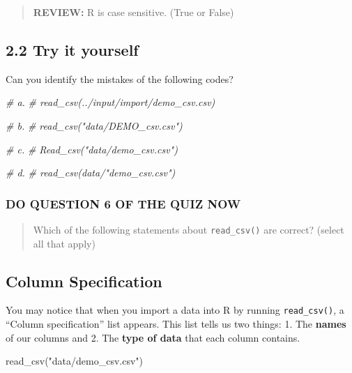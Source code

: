 \documentclass[
]{book}
\newenvironment{Shaded}{\begin{snugshade}}{\end{snugshade}}
\newcommand{\CommentTok}[1]{\textcolor[rgb]{0.56,0.35,0.01}{\textit{#1}}}
\newcommand{\FunctionTok}[1]{\textcolor[rgb]{0.00,0.00,0.00}{#1}}
\newcommand{\NormalTok}[1]{#1}
\newcommand{\StringTok}[1]{\textcolor[rgb]{0.31,0.60,0.02}{#1}}
\begin{document}
\begin{quote}
\textbf{REVIEW:} R is case sensitive. (True or False)
\end{quote}

\hypertarget{try-it-yourself-10}{%
\subsection{2.2 Try it yourself}\label{try-it-yourself-10}}

Can you identify the mistakes of the following codes?

\begin{Shaded}
\begin{Highlighting}[]
\CommentTok{\# a. }
\CommentTok{\# read\_csv(../input/import/demo\_csv.csv)}

\CommentTok{\# b.}
\CommentTok{\# read\_csv("data/DEMO\_csv.csv")}

\CommentTok{\# c.}
\CommentTok{\# Read\_csv("data/demo\_csv.csv")}

\CommentTok{\# d. }
\CommentTok{\# read\_csv(data/"demo\_csv.csv")}
\end{Highlighting}
\end{Shaded}

\hypertarget{do-question-6-of-the-quiz-now}{%
\subsubsection{DO QUESTION 6 OF THE QUIZ NOW}\label{do-question-6-of-the-quiz-now}}

\begin{quote}
Which of the following statements about \texttt{read\_csv()} are correct? (select all that apply)
\end{quote}

\hypertarget{column-specification}{%
\subsection{Column Specification}\label{column-specification}}

You may notice that when you import a data into R by running \texttt{read\_csv()}, a ``Column specification'' list appears. This list tells us two things:
1. The \textbf{names} of our columns and
2. The \textbf{type of data} that each column contains.

\begin{Shaded}
\begin{Highlighting}[]
\FunctionTok{read\_csv}\NormalTok{(}\StringTok{"data/demo\_csv.csv"}\NormalTok{)}
\end{Highlighting}
\end{Shaded}
\end{document}
